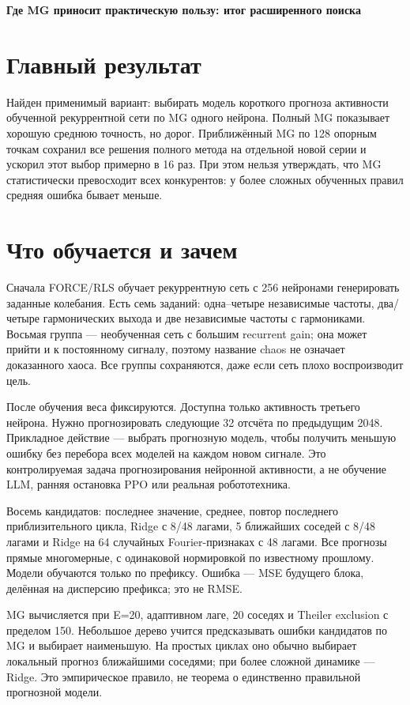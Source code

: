 \documentclass[10pt,a4paper]{article}
\begin{document}
{\Large\bfseries Где MG приносит практическую пользу: итог расширенного поиска}\par\medskip

\section*{Главный результат}

Найден применимый вариант: выбирать модель короткого прогноза активности обученной рекуррентной сети по MG одного нейрона. Полный MG показывает хорошую среднюю точность, но дорог. Приближённый MG по 128 опорным точкам сохранил все решения полного метода на отдельной новой серии и ускорил этот выбор примерно в 16 раз. При этом нельзя утверждать, что MG статистически превосходит всех конкурентов: у более сложных обученных правил средняя ошибка бывает меньше.

\section*{Что обучается и зачем}

Сначала FORCE/RLS обучает рекуррентную сеть с 256 нейронами генерировать заданные колебания. Есть семь заданий: одна--четыре независимые частоты, два/четыре гармонических выхода и две независимые частоты с гармониками. Восьмая группа --- необученная сеть с большим recurrent gain; она может прийти и к постоянному сигналу, поэтому название chaos не означает доказанного хаоса. Все группы сохраняются, даже если сеть плохо воспроизводит цель.

После обучения веса фиксируются. Доступна только активность третьего нейрона. Нужно прогнозировать следующие 32 отсчёта по предыдущим 2048. Прикладное действие --- выбрать прогнозную модель, чтобы получить меньшую ошибку без перебора всех моделей на каждом новом сигнале. Это контролируемая задача прогнозирования нейронной активности, а не обучение LLM, ранняя остановка PPO или реальная робототехника.

Восемь кандидатов: последнее значение, среднее, повтор последнего приблизительного цикла, Ridge с 8/48 лагами, 5 ближайших соседей с 8/48 лагами и Ridge на 64 случайных Fourier-признаках с 48 лагами. Все прогнозы прямые многомерные, с одинаковой нормировкой по известному прошлому. Модели обучаются только по префиксу. Ошибка --- MSE будущего блока, делённая на дисперсию префикса; это не RMSE.

MG вычисляется при E=20, адаптивном лаге, 20 соседях и Theiler exclusion с пределом 150. Небольшое дерево учится предсказывать ошибки кандидатов по MG и выбирает наименьшую. На простых циклах оно обычно выбирает локальный прогноз ближайшими соседями; при более сложной динамике --- Ridge. Это эмпирическое правило, не теорема о единственно правильной прогнозной модели.
\end{document}

